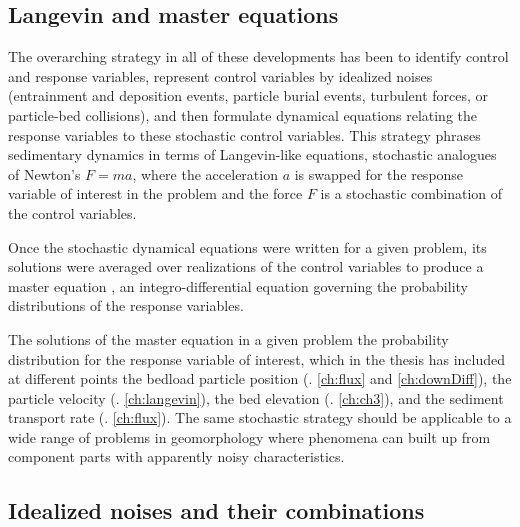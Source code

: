 \subsection{Langevin and master equations}

The overarching strategy in all of these developments has been to identify control and response variables, represent control variables by idealized noises (entrainment and deposition events, particle burial events, turbulent forces, or particle-bed collisions), and then formulate dynamical equations relating the response variables to these stochastic control variables.
This strategy phrases sedimentary dynamics in terms of Langevin-like equations, stochastic \DIFaddbegin {}\DIFaddend analogues of Newton's $F=ma$, where the acceleration $a$ is swapped for the response variable of interest in the problem and the force $F$ is a stochastic combination of the control variables. 

Once the stochastic dynamical equations were written for a given problem, its solutions were averaged over realizations of the control variables to produce a master equation \DIFaddbegin {}\DIFaddend , an integro-differential equation governing the probability distributions of the response variables.

The solutions of the master equation in a given problem \DIFdelbegin {}\DIFdelend \DIFaddbegin {}\DIFaddend the probability distribution for the response variable of interest, which in the thesis has included at different points the bedload particle position (\DIFdelbegin {}\DIFdelend \DIFaddbegin {}\DIFaddend . \ref{ch:flux} and \ref{ch:downDiff}), the particle velocity (\DIFdelbegin {}\DIFdelend \DIFaddbegin {}\DIFaddend . \ref{ch:langevin}), the bed elevation (\DIFdelbegin {}\DIFdelend \DIFaddbegin {}\DIFaddend . \ref{ch:ch3}), and the sediment transport rate (\DIFdelbegin {}\DIFdelend \DIFaddbegin {}\DIFaddend . \ref{ch:flux}).
The same stochastic strategy should be applicable to a wide range of problems in geomorphology where phenomena can \DIFaddbegin {}\DIFaddend built up from component parts with apparently noisy characteristics.


\subsection{Idealized noises and their combinations}


